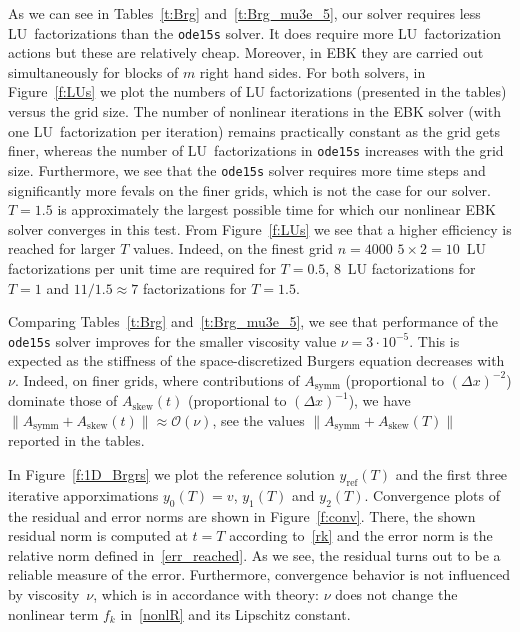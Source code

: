 \documentclass[sn-aps]{sn-jnl}
\theoremstyle{thmstyleone}%
\theoremstyle{thmstyletwo}%
\theoremstyle{thmstylethree}%
\newcommand{\Asymm}{A_{\mathrm{symm}}}
\newcommand{\Askew}{A_{\mathrm{skew}}}
\begin{document}
As we can see in Tables~\ref{t:Brg} and~\ref{t:Brg_mu3e_5}, 
our solver requires less LU~factorizations than the \texttt{ode15s} solver.
It does require more LU~factorization actions but these are relatively cheap.
Moreover, in EBK they are carried out simultaneously for blocks of $m$ right hand
sides.
For both solvers, in Figure~\ref{f:LUs} we plot the numbers of LU factorizations
(presented in the tables) versus the grid size.
The number of nonlinear iterations in the EBK solver
(with one LU~factorization per iteration) remains practically constant as
the grid gets finer, whereas the number of LU~factorizations in \texttt{ode15s}
increases with the grid size.  
Furthermore, we see that the \texttt{ode15s} solver requires
more time steps and significantly more fevals on the finer grids,
which is not the case for our solver.
$T=1.5$ is approximately the largest possible time for which our nonlinear EBK 
solver converges in this test.  From Figure~\ref{f:LUs} we see that 
a higher efficiency is reached for larger $T$ values.
Indeed, on the finest grid $n=4000$ 
$5\times 2= 10$~LU factorizations per unit time are required for $T=0.5$,
$8$~LU factorizations for $T=1$ and $11/1.5\approx 7$ factorizations for
$T=1.5$.    

Comparing Tables~\ref{t:Brg} and~\ref{t:Brg_mu3e_5}, we see that performance of 
the \texttt{ode15s} solver improves for the smaller viscosity value $\nu=3\cdot 10^{-5}$.
This is expected as the stiffness of the space-discretized Burgers equation
decreases with $\nu$.  Indeed, on finer grids, where contributions of $\Asymm$ 
(proportional to $(\Delta x)^{-2}$) dominate those of $\Askew(t)$ 
(proportional to $(\Delta x)^{-1}$),
we have $\|\Asymm+\Askew(t)\|\approx\mathcal{O}(\nu)$, see the values
$\|\Asymm+\Askew(T)\|$ reported in the tables. 

In Figure~\ref{f:1D_Brgrs} we plot the reference solution $y_{\mathrm{ref}}(T)$ and 
the first three iterative apporximations $y_0(T)=v$, $y_1(T)$ and $y_2(T)$.
Convergence plots of the residual and error norms are shown in Figure~\ref{f:conv}.
There, the shown residual norm is computed at $t=T$ according to~\eqref{rk} and
the error norm is the relative norm defined in~\eqref{err_reached}.
As we see, the residual turns out to be a reliable measure of the error.
Furthermore, convergence behavior is not influenced by viscosity~$\nu$, which is
in accordance with theory:
$\nu$ does not change the nonlinear term $f_k$ in~\eqref{nonlR}
and its Lipschitz constant.
\end{document}
